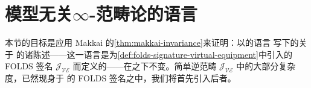\providecommand{\JVE}{\mathcal{J}_{\mathcal{VE}}}
\providecommand{\JVDbl}{\mathcal{J}_{v\mathcal{D}bl\mathcal{C}at}}
\providecommand{\Mof}[1]{\mathrm{M}_{#1}}

\section{模型无关\texorpdfstring{$\infty$}{∞}-范畴论的语言}\label{sec:language-for-model-independent-infinity-category-theory}

本节的目标是应用 Makkai 的\cref{thm:makkai-invariance}来证明：以\trVirtualEquipment{}的语言
写下的关于%
\trInfinityCategories{}的诸陈述——这一语言是为\cref{def:folds-signature-virtual-equipment}中引入的 FOLDS 签名
$\JVE$ 而定义的——在\trChangeOfModel{}之下不变。简单逆范畴
$\JVE$ 中的大部分复杂度，已然现身于%
\trVirtualDoubleCategory{}的 FOLDS 签名之中，我们将首先引入后者。

